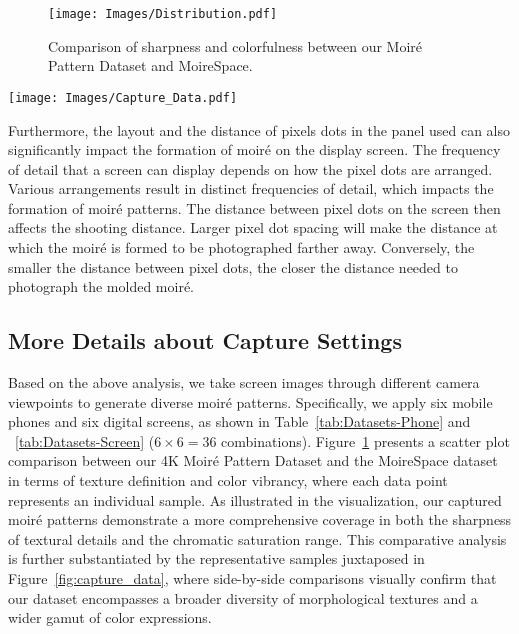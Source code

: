 \begin{figure}[t]
  \centering
    \texttt{[image: Images/Distribution.pdf]}
  \caption{Comparison of sharpness and colorfulness between our Moiré Pattern Dataset and MoireSpace.} 
  \label{fig:distribution}
\end{figure}


\begin{figure*}[!p]
  \centering
    \texttt{[image: Images/Capture\_Data.pdf]}
  \caption{Samples from MoireSpace~\cite{yang2023doing} and our 4K Moiré Pattern Dataset.}
  \label{fig:capture_data}
\end{figure*}

Furthermore, the layout and the distance of pixels dots in the panel used can also significantly impact the formation of moiré on the display screen. The frequency of detail that a screen can display depends on how the pixel dots are arranged. Various arrangements result in distinct frequencies of detail, which impacts the formation of moiré patterns. The distance between pixel dots on the screen then affects the shooting distance. Larger pixel dot spacing will make the distance at which the moiré is formed to be photographed farther away. Conversely, the smaller the distance between pixel dots, the closer the distance needed to photograph the molded moiré.

\subsection{More Details about Capture Settings}
Based on the above analysis, we take screen images through different camera viewpoints to generate diverse moiré patterns. Specifically, we apply six mobile phones and six digital screens, as shown in Table~\ref{tab:Datasets-Phone} and ~\ref{tab:Datasets-Screen} ($\text{6} \times \text{6} = \text{36}$ combinations). 
Figure~\ref{fig:distribution} presents a scatter plot comparison between our 4K Moiré Pattern Dataset and the MoireSpace dataset in terms of texture definition and color vibrancy, where each data point represents an individual sample. As illustrated in the visualization, our captured moiré patterns demonstrate a more comprehensive coverage in both the sharpness of textural details and the chromatic saturation range. This comparative analysis is further substantiated by the representative samples juxtaposed in Figure~\ref{fig:capture_data}, where side-by-side comparisons visually confirm that our dataset encompasses a broader diversity of morphological textures and a wider gamut of color expressions.

